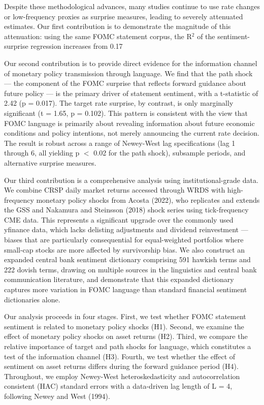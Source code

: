 \documentclass[12pt]{article}
\begin{document}
Despite these methodological advances, many studies continue to use rate changes or low-frequency proxies as surprise measures, leading to severely attenuated estimates. Our first contribution is to demonstrate the magnitude of this attenuation: using the same FOMC statement corpus, the R$^2$ of the sentiment-surprise regression increases from 0.17%

Our second contribution is to provide direct evidence for the information channel of monetary policy transmission through language. We find that the path shock --- the component of the FOMC surprise that reflects forward guidance about future policy --- is the primary driver of statement sentiment, with a t-statistic of 2.42 (p = 0.017). The target rate surprise, by contrast, is only marginally significant (t = 1.65, p = 0.102). This pattern is consistent with the view that FOMC language is primarily about revealing information about future economic conditions and policy intentions, not merely announcing the current rate decision. The result is robust across a range of Newey-West lag specifications (lag 1 through 6, all yielding p $<$ 0.02 for the path shock), subsample periods, and alternative surprise measures.

Our third contribution is a comprehensive analysis using institutional-grade data. We combine CRSP daily market returns accessed through WRDS with high-frequency monetary policy shocks from Acosta (2022), who replicates and extends the GSS and Nakamura and Steinsson (2018) shock series using tick-frequency CME data. This represents a significant upgrade over the commonly used yfinance data, which lacks delisting adjustments and dividend reinvestment --- biases that are particularly consequential for equal-weighted portfolios where small-cap stocks are more affected by survivorship bias. We also construct an expanded central bank sentiment dictionary comprising 591 hawkish terms and 222 dovish terms, drawing on multiple sources in the linguistics and central bank communication literature, and demonstrate that this expanded dictionary captures more variation in FOMC language than standard financial sentiment dictionaries alone.

Our analysis proceeds in four stages. First, we test whether FOMC statement sentiment is related to monetary policy shocks (H1). Second, we examine the effect of monetary policy shocks on asset returns (H2). Third, we compare the relative importance of target and path shocks for language, which constitutes a test of the information channel (H3). Fourth, we test whether the effect of sentiment on asset returns differs during the forward guidance period (H4). Throughout, we employ Newey-West heteroskedasticity and autocorrelation consistent (HAC) standard errors with a data-driven lag length of L = 4, following Newey and West (1994).
\end{document}
